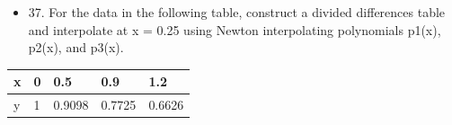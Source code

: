 \documentclass{article}
\begin{document}
\newpage
\begin{itemize}
    \item 37. For the data in the following table, construct a divided differences
          table and interpolate at x = 0.25 using Newton interpolating
          polynomials p1(x), p2(x), and p3(x).
\end{itemize}

\begin{table}[h!]
    \begin{tabular}{l|l|l|l|l}
        \hline
        \multicolumn{1}{|p{30.865313pt}}{\raggedright x} & \multicolumn{1}{|p{31.618126pt}}{\raggedright 0} & \multicolumn{1}{|p{33.12375pt}}{\raggedright 0.5}    & \multicolumn{1}{|p{33.876564pt}}{\raggedright 0.9}    & \multicolumn{1}{|p{37.640625pt}|}{\raggedright 1.2}    \\
        \hline
        \multicolumn{1}{|p{30.865313pt}}{\raggedright y} & \multicolumn{1}{|p{31.618126pt}}{\raggedright 1} & \multicolumn{1}{|p{33.12375pt}}{\raggedright 0.9098} & \multicolumn{1}{|p{33.876564pt}}{\raggedright 0.7725} & \multicolumn{1}{|p{37.640625pt}|}{\raggedright 0.6626} \\
        \hline
    \end{tabular}
\end{table}
\end{document}
